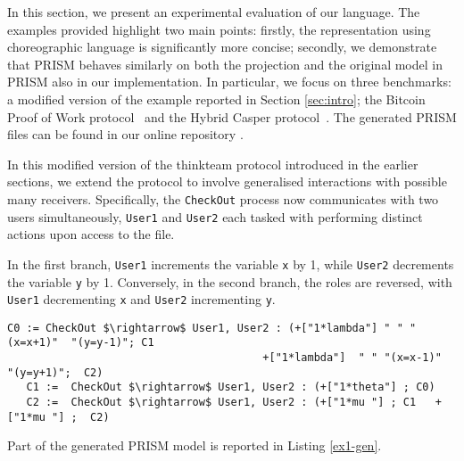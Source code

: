 {In this section, we present an experimental evaluation of our
  language.  The examples provided highlight two main points: firstly,
  the representation using choreographic language is significantly
  more concise; secondly, we demonstrate that PRISM behaves similarly
  on both the projection and the original model in PRISM also in our
  implementation. }
In particular, we focus on three benchmarks: a modified version of the
example reported in Section \ref{sec:intro}; the Bitcoin Proof of Work
protocol~\cite{DBLP:journals/concurrency/BistarelliNGLMV23} and the
Hybrid Casper
protocol~\cite{DBLP:journals/distribledger/GallettaLMV23}.  The
generated PRISM files can be found in our online repository
\cite{repository}.


In this modified version of the thinkteam protocol introduced in the earlier sections, we extend the protocol to involve generalised interactions with possible many receivers. Specifically, the \texttt{CheckOut} process now communicates with two users simultaneously, \texttt{User1} and \texttt{User2} each tasked with performing distinct actions upon access to the file. 

 In the first branch, \texttt{User1} increments the variable \texttt{x} by 1, while \texttt{User2} decrements the variable \texttt{y} by 1. Conversely, in the second branch, the roles are reversed, with \texttt{User1} decrementing \texttt{x} and \texttt{User2} incrementing \texttt{y}.

 \begin{lstlisting}[style=chor-color,breaklines=true, postbreak=\mbox{\textcolor{red}{$\hookrightarrow$}\space},caption={Choreography for the Modified thinkteam Protocol},captionpos=b,label={ex1-chor}]
   C0 := CheckOut $\rightarrow$ User1, User2 : (+["1*lambda"] " " "(x=x+1)"  "(y=y-1)"; C1
                                       	+["1*lambda"]  " " "(x=x-1)"  "(y=y+1)";  C2)
   C1 :=  CheckOut $\rightarrow$ User1, User2 : (+["1*theta"] ; C0)  
   C2 :=  CheckOut $\rightarrow$ User1, User2 : (+["1*mu "] ; C1   +["1*mu "] ;  C2)
 \end{lstlisting}

 Part of the generated PRISM model is reported in Listing \ref{ex1-gen}. 

